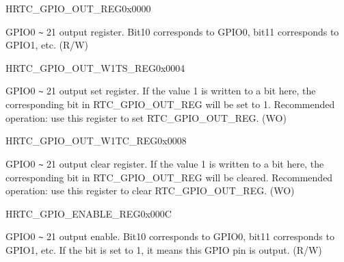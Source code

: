 \begin{register}{H}{RTC\_GPIO\_OUT\_REG}{0x{}0000}\label{regdesc:RTCIORTCGPIOOUTREG}
%
%
\regnewline%
\begin{regdesc}\begin{reglist}
\label{fielddesc:RTCIOGPIOOUTDATA}\item [RTC\_GPIO\_OUT\_DATA] GPIO0 \verb+~+ 21 output register. Bit10 corresponds to GPIO0, bit11 corresponds to GPIO1, etc. (R/W)
\end{reglist}\end{regdesc}
\end{register}


\begin{register}{H}{RTC\_GPIO\_OUT\_W1TS\_REG}{0x{}0004}\label{regdesc:RTCIORTCGPIOOUTW1TSREG}
%
%
\regnewline%
\begin{regdesc}\begin{reglist}
\label{fielddesc:RTCIOGPIOOUTDATAW1TS}\item [RTC\_GPIO\_OUT\_DATA\_W1TS] GPIO0 \verb+~+ 21 output set register. If the value 1 is written to a bit here, the corresponding bit in RTC\_GPIO\_OUT\_REG will be set to 1. Recommended operation: use this register to set RTC\_GPIO\_OUT\_REG. (WO)
\end{reglist}\end{regdesc}
\end{register}


\begin{register}{H}{RTC\_GPIO\_OUT\_W1TC\_REG}{0x{}0008}\label{regdesc:RTCIORTCGPIOOUTW1TCREG}
%
%
\regnewline%
\begin{regdesc}\begin{reglist}
\label{fielddesc:RTCIOGPIOOUTDATAW1TC}\item [RTC\_GPIO\_OUT\_DATA\_W1TC] GPIO0 \verb+~+ 21 output clear register. If the value 1 is written to a bit here, the corresponding bit in RTC\_GPIO\_OUT\_REG will be cleared. Recommended operation: use this register to clear RTC\_GPIO\_OUT\_REG. (WO)
\end{reglist}\end{regdesc}
\end{register}


\begin{register}{H}{RTC\_GPIO\_ENABLE\_REG}{0x{}000C}\label{regdesc:RTCIORTCGPIOENABLEREG}
%
%
\regnewline%
\begin{regdesc}\begin{reglist}
\label{fielddesc:RTCIOREGRTCIOREGGPIOENABLE}\item [RTC\_GPIO\_ENABLE] GPIO0 \verb+~+ 21 output enable. Bit10 corresponds to GPIO0, bit11 corresponds to GPIO1, etc. If the bit is set to 1, it means this GPIO pin is output. (R/W)
\end{reglist}\end{regdesc}
\end{register}


